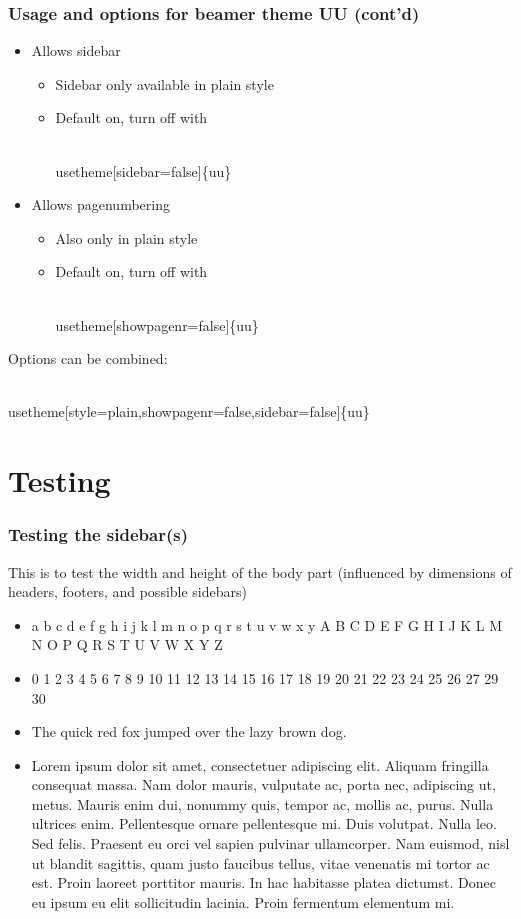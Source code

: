 \begin{frame}
\frametitle{Usage and options for beamer theme UU (cont'd)}
\begin{itemize}
\item Allows sidebar
    \begin{itemize}
    \item Sidebar only available in plain style
    \item Default on, turn off with \begin{semiverbatim}\\usetheme[sidebar=false]\{uu\}\end{semiverbatim}
    \end{itemize}
\item Allows pagenumbering
    \begin{itemize}
    \item Also only in plain style
    \item Default on, turn off with \begin{semiverbatim}\\usetheme[showpagenr=false]\{uu\}\end{semiverbatim}
    \end{itemize}
\end{itemize}
Options can be combined:
\begin{semiverbatim}\\usetheme[style=plain,showpagenr=false,sidebar=false]\{uu\}\end{semiverbatim}
\end{frame}

\section{Testing}%

\begin{frame}
\frametitle{Testing the sidebar(s)}
This is to test the width and height of the body part (influenced by dimensions of headers, footers, and possible sidebars)
\begin{itemize}
\item a b c d e f g h i j k l m n o p q r s t u v w x y A B C D E F G H I J K L M N O P Q R S T U V W X Y Z
\item 0 1 2 3 4 5 6 7 8 9 10 11 12 13 14 15 16 17 18 19 20 21 22 23 24 25 26 27 29 30
\item The quick red fox jumped over the lazy brown dog. 
\item Lorem ipsum dolor sit amet, consectetuer adipiscing elit. Aliquam fringilla consequat massa. Nam dolor mauris, vulputate ac, porta nec, adipiscing ut, metus. Mauris enim dui, nonummy quis, tempor ac, mollis ac, purus. Nulla ultrices enim. Pellentesque ornare pellentesque mi. Duis volutpat. Nulla leo. Sed felis. Praesent eu orci vel sapien pulvinar ullamcorper. Nam euismod, nisl ut blandit sagittis, quam justo faucibus tellus, vitae venenatis mi tortor ac est. Proin laoreet porttitor mauris. In hac habitasse platea dictumst. Donec eu ipsum eu elit sollicitudin lacinia. Proin fermentum elementum mi.
\end{itemize}
\end{frame}


